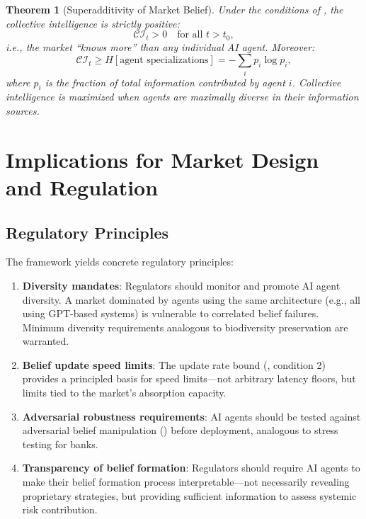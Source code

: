 \documentclass[12pt,a4paper]{article}
\newtheorem{theorem}{Theorem}[section]
\theoremstyle{definition}
\begin{document}
\begin{theorem}[Superadditivity of Market Belief]\label{thm:superadditivity}
Under the conditions of , the collective intelligence is strictly positive:
\begin{equation}
  \mathcal{CI}_t > 0 \quad \text{for all } t > t_0,
\end{equation}
i.e., the market ``knows more'' than any individual AI agent. Moreover:
\begin{equation}
  \mathcal{CI}_t \geq H[\text{agent specializations}] = -\sum_i p_i \log p_i,
\end{equation}
where $p_i$ is the fraction of total information contributed by agent $i$. Collective intelligence is maximized when agents are maximally diverse in their information sources.
\end{theorem}

\section{Implications for Market Design and Regulation}\label{sec:implications}

\subsection{Regulatory Principles}

The framework yields concrete regulatory principles:

\begin{enumerate}
  \item \textbf{Diversity mandates}: Regulators should monitor and promote AI agent diversity. A market dominated by agents using the same architecture (e.g., all using GPT-based systems) is vulnerable to correlated belief failures. Minimum diversity requirements analogous to biodiversity preservation are warranted.

  \item \textbf{Belief update speed limits}: The update rate bound (, condition 2) provides a principled basis for speed limits---not arbitrary latency floors, but limits tied to the market's absorption capacity.

  \item \textbf{Adversarial robustness requirements}: AI agents should be tested against adversarial belief manipulation () before deployment, analogous to stress testing for banks.

  \item \textbf{Transparency of belief formation}: Regulators should require AI agents to make their belief formation process interpretable---not necessarily revealing proprietary strategies, but providing sufficient information to assess systemic risk contribution.
\end{enumerate}
\end{document}
